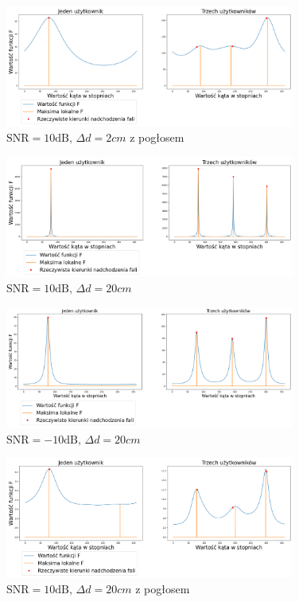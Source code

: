 \begin{figure}[H]
    \centering
    \includegraphics[width=0.85\textwidth]{Images/music_10db_reverb.png}
    \caption{$\mathrm{SNR}=10\mathrm{dB}, \, \Delta d = 2cm$ z pogłosem}
    \label{fig:music_10db_2cm_reverb}
\end{figure}

\begin{figure}[H]
    \centering
    \includegraphics[width=0.85\textwidth]{Images/music_10db_0.2m.png}
    \caption{$\mathrm{SNR}=10\mathrm{dB}, \, \Delta d = 20cm$}
    \label{fig:music_10db_20cm}
\end{figure}

\begin{figure}[H]
    \centering
    \includegraphics[width=0.85\textwidth]{Images/music_-10db_0.2m.png}
    \caption{$\mathrm{SNR}=-10\mathrm{dB}, \, \Delta d = 20cm$}
    \label{fig:music_-10db_20cm}
\end{figure}

\begin{figure}[H]
    \centering
    \includegraphics[width=0.85\textwidth]{Images/music_10db_reverb_0.2m.png}
    \caption{$\mathrm{SNR}=10\mathrm{dB}, \, \Delta d = 20cm$ z pogłosem}
    \label{fig:music_10db_20cm_reverb}
\end{figure}

